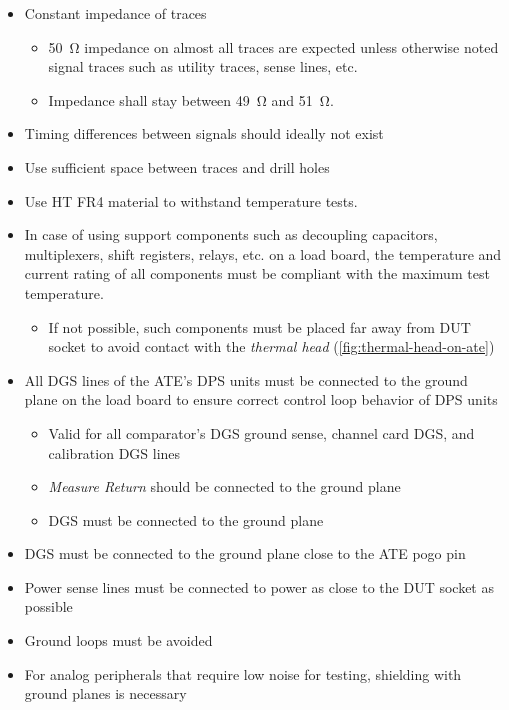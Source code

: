 \begin{itemize}[topsep=8pt,itemsep=4pt,partopsep=4pt, parsep=4pt]

    \item Constant impedance of traces \autocite{36225}
    \begin{itemize}
        \item \SI{50}{\ohm} impedance on almost all traces are expected unless
        otherwise noted signal traces such as utility traces, sense lines,
        etc.

        \item Impedance shall stay between \SI{49}{\ohm} and \SI{51}{\ohm}.
    \end{itemize}

    \item Timing differences between signals should ideally not exist

    \item Use sufficient space between traces and drill holes

    \item Use \ac{HT} FR4 material to withstand temperature tests.

    \item In case of using support components such as decoupling capacitors,
    multiplexers, shift registers, relays, etc. on a load board, the
    temperature and current rating of all components must be compliant with
    the maximum test temperature.
    \begin{itemize}
        \item If not possible, such components must be placed far away from
        \ac{DUT} socket to avoid contact with the \emph{thermal head}
        (\autoref{fig:thermal-head-on-ate})
    \end{itemize}

    \item All \ac{DGS} lines of the \ac{ATE}'s
    \ac{DPS} units must be connected to the ground plane on the load board
    to ensure correct control loop behavior of \ac{DPS} units
    \begin{itemize}
        \item Valid for all comparator's \ac{DGS} ground sense, channel
        card \ac{DGS}, and calibration \ac{DGS} lines

        \item \emph{Measure Return} should be connected to the ground plane
        \item \ac{DGS} must be connected to the ground plane
    \end{itemize}

    \item \ac{DGS} must be connected to the ground plane close to the
    \ac{ATE} pogo pin
    \item Power sense lines must be connected to power as close to the
    \ac{DUT} socket as possible
    \item Ground loops must be avoided
    \item For analog peripherals that require low noise for testing,
    shielding with ground planes is necessary

\end{itemize}

